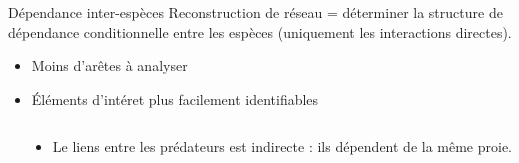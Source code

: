 \documentclass[11pt]{beamer}
\newcommand{\edgeunit}{1.5}
\newcommand{\emphase}[1]{\textcolor{Complement}{#1}}
\begin{document}
\begin{frame}{Dépendance inter-espèces}
 Reconstruction de réseau = déterminer la structure de \emphase{dépendance conditionnelle}  entre les espèces (uniquement les interactions directes).\\
 \vspace{0.5cm}
	\begin{itemize}
	\item Moins d'arêtes à analyser
	\item Éléments d'intéret plus facilement identifiables
	\end{itemize}
	\begin{columns}
\begin{column}{0.3\linewidth}\hspace{0.5cm}
\\
\end{column}
\begin{column}{0.5\linewidth}
	\begin{itemize}
	\item Le liens entre les prédateurs est indirecte : ils dépendent de la même proie.
	
\end{itemize}
\end{column}
\end{columns}
\end{frame}
\end{document}
